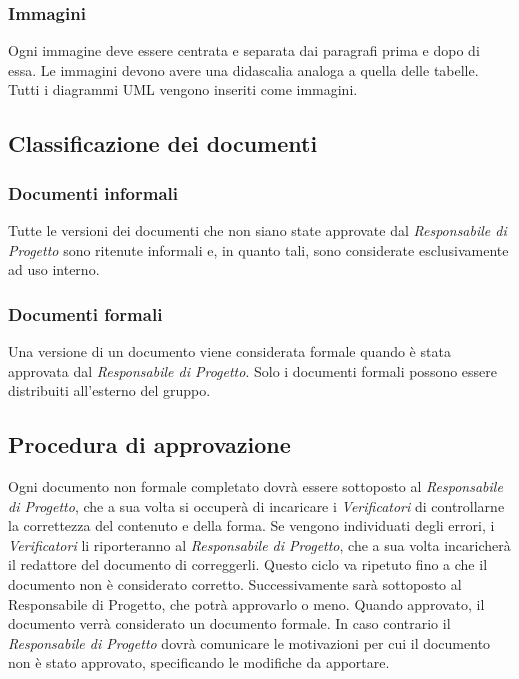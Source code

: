 \documentclass[../NormediProgetto.tex]{subfiles}
\begin{document}
\subsubsection{Immagini}

Ogni immagine deve essere centrata e separata dai paragrafi prima e dopo di essa. Le immagini devono avere una didascalia analoga a quella delle tabelle. Tutti i diagrammi UML vengono inseriti come immagini.

\subsection{Classificazione dei documenti}

\subsubsection{Documenti informali}

Tutte le versioni dei documenti che non siano state approvate dal \textit{Responsabile di Progetto} sono ritenute informali e, in quanto tali, sono considerate esclusivamente ad uso interno.

\subsubsection{Documenti formali}

Una versione di un documento viene considerata formale quando è stata approvata dal \textit{Responsabile di Progetto}. Solo i documenti formali possono essere distribuiti all’esterno del gruppo. 

\subsection{Procedura di approvazione}

Ogni documento non formale completato dovrà essere sottoposto al \textit{Responsabile di Progetto}, che a sua volta si occuperà di incaricare i \textit{Verificatori} di controllarne la correttezza del contenuto e della forma. Se vengono individuati degli errori, i \textit{Verificatori} li riporteranno al \textit{Responsabile di Progetto}, che a sua volta incaricherà il redattore del documento di correggerli. Questo ciclo va ripetuto fino a che il documento non è considerato corretto. Successivamente sarà sottoposto al Responsabile di Progetto, che potrà approvarlo o meno. Quando approvato, il documento verrà considerato un documento formale. In caso contrario il \textit{Responsabile di Progetto} dovrà comunicare le motivazioni per cui il documento non è stato approvato, specificando le modifiche da apportare.
\end{document}

